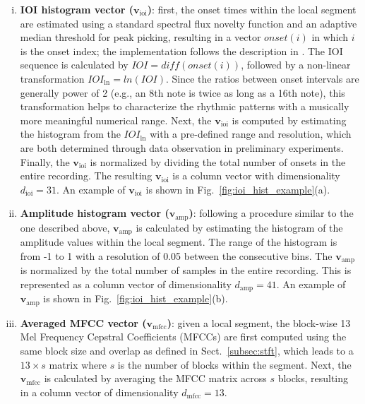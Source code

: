 \documentclass[conference]{IEEEtran}
\begin{document}
\begin{enumerate}[(i)]
    \item   \textbf{IOI histogram vector ($\mathbf{v}_\mathrm{ioi}$)}: first, the onset times within the local segment are estimated using a standard spectral flux novelty function and an adaptive median threshold for peak picking, resulting in a vector $onset(i)$ in which $i$ is the onset index; the implementation follows the description in \cite{Lerch2012}. The IOI sequence is calculated by $IOI = diff(onset(i))$, followed by a non-linear transformation $IOI_\mathrm{ln} = ln(IOI)$. Since the ratios between onset intervals are generally power of 2 (e.g., an 8th note is twice as long as a 16th note), this transformation helps to characterize the rhythmic patterns with a musically more meaningful numerical range. Next, the $\mathbf{v}_\mathrm{ioi}$ is computed by estimating the histogram from the $IOI_\mathrm{ln}$ with a pre-defined range and resolution, which are both determined through data observation in preliminary experiments. Finally, the $\mathbf{v}_\mathrm{ioi}$ is normalized by dividing the total number of onsets in the entire recording. The resulting $\mathbf{v}_\mathrm{ioi}$ is a column vector with dimensionality $d_\mathrm{ioi} = 31$. An example of  $\mathbf{v}_\mathrm{ioi}$ is shown in Fig.~\ref{fig:ioi_hist_example}(a).

    \item   \textbf{Amplitude histogram vector ($\mathbf{v}_\mathrm{amp}$)}: following a procedure similar to the one described above, $\mathbf{v}_\mathrm{amp}$ is calculated by estimating the histogram of the amplitude values within the local segment. The range of the histogram is from -1 to 1 with a resolution of 0.05 between the consecutive bins. The $\mathbf{v}_\mathrm{amp}$ is normalized by the total number of samples in the entire recording. This is represented as a column vector of dimensionality $d_\mathrm{amp} = 41$. An example of  $\mathbf{v}_\mathrm{amp}$ is shown in Fig.~\ref{fig:ioi_hist_example}(b).

    \item   \textbf{Averaged MFCC vector ($\mathbf{v}_\mathrm{mfcc}$)}: given a local segment, the block-wise 13 Mel Frequency Cepstral Coefficients (MFCCs) are first computed using the same block size and overlap as defined in Sect.~\ref{subsec:stft}, which leads to a $13 \times s$ matrix where $s$ is the number of blocks within the segment. Next, the $\mathbf{v}_\mathrm{mfcc}$ is calculated by averaging the MFCC matrix across $s$ blocks, resulting in a column vector of dimensionality $d_\mathrm{mfcc} = 13$. 
\end{enumerate} 
\end{document}
